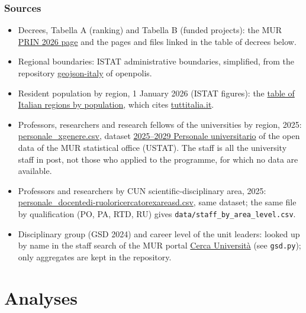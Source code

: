\documentclass[11pt,a4paper]{article}
\begin{document}
\subsubsection*{Sources}
\begin{itemize}
\item Decrees, Tabella A (ranking) and Tabella B (funded projects): the MUR \href{https://prin.mur.gov.it/Pages/Index/301}{PRIN 2026 page} and the pages and files linked in the table of decrees below.
\item Regional boundaries: ISTAT administrative boundaries, simplified, from the repository \href{https://github.com/openpolis/geojson-italy}{geojson-italy} of openpolis.
\item Resident population by region, 1 January 2026 (ISTAT figures): the \href{https://en.wikipedia.org/wiki/List_of_Italian_regions_by_population}{table of Italian regions by population}, which cites \href{https://www.tuttitalia.it}{tuttitalia.it}.
\item Professors, researchers and research fellows of the universities by region, 2025: \href{https://dati-ustat.mur.gov.it/dataset/28d258e4-85b2-43e8-b74f-ed2392ef16db/resource/eceaccb5-d130-4d60-a531-5a4f74b293a6/download/personale_xgenere.csv}{personale\_xgenere.csv}, dataset \href{https://dati-ustat.mur.gov.it/dataset/2025-2029-personale-universitario}{2025--2029 Personale universitario} of the open data of the MUR statistical office (USTAT). The staff is all the university staff in post, not those who applied to the programme, for which no data are available.
\item Professors and researchers by CUN scientific-disciplinary area, 2025: \href{https://dati-ustat.mur.gov.it/dataset/28d258e4-85b2-43e8-b74f-ed2392ef16db/resource/86ec9e91-27c3-400f-b1d2-389f7f4394aa/download/personale_docentedi-ruoloricercatorexareasd.csv}{personale\_docentedi-ruoloricercatorexareasd.csv}, same dataset; the same file by qualification (PO, PA, RTD, RU) gives \texttt{data/staff\_by\_area\_level.csv}.
\item Disciplinary group (GSD 2024) and career level of the unit leaders: looked up by name in the staff search of the MUR portal \href{https://cercauniversita.mur.gov.it}{Cerca Universit\`a} (see \texttt{gsd.py}); only aggregates are kept in the repository.
\end{itemize}

\section{Analyses}
\end{document}
